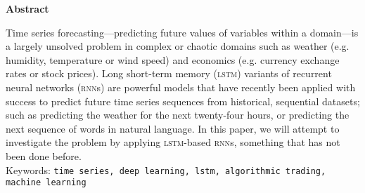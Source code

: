 \begin{center}
  \textbf{Abstract}

  \vspace{5mm}

  \small\parbox{0.8\textwidth}{
    Time series forecasting---predicting future values of variables within a domain---is a largely unsolved problem in complex or chaotic domains such as weather (e.g. humidity, temperature or wind speed) and economics (e.g. currency exchange rates or stock prices). Long short-term memory (\textsc{lstm}) variants of recurrent neural networks (\textsc{rnn}s) are powerful models that have recently been applied with success to predict future time series sequences from historical, sequential datasets; such as predicting the weather for the next twenty-four hours, or predicting the next sequence of words in natural language. In this paper, we will attempt to investigate the problem by applying \textsc{lstm}-based \textsc{rnn}s, something that has not been done before.\\

    Keywords: \texttt{time series, deep learning, lstm, algorithmic trading, machine learning}
  }
\end{center}
